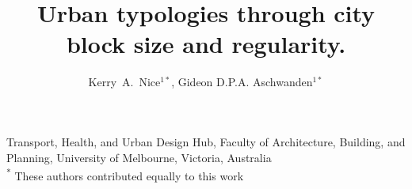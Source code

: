 \documentclass{nature}
\title{Urban typologies through city block size and regularity.}
\author{Kerry~A.~Nice$^{1*}$,
Gideon D.P.A. Aschwanden$^{1*}$
}
\begin{document}
\maketitle

\begin{affiliations}
 \item Transport, Health, and Urban Design Hub, Faculty of Architecture, Building, and Planning, University of Melbourne, Victoria, Australia
 \\ \textsuperscript{*} These authors contributed equally to this work
\end{affiliations}
\end{document}
